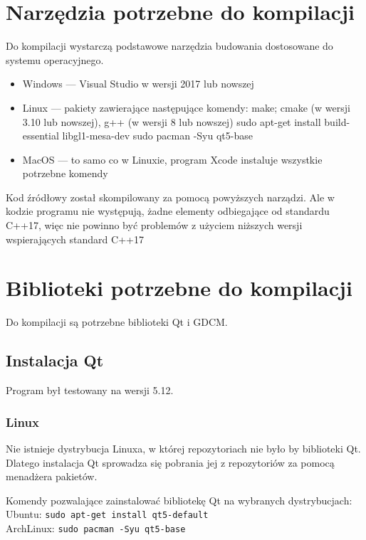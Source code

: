 
\section{Narzędzia potrzebne do kompilacji}

\par
Do kompilacji wystarczą podstawowe narzędzia budowania dostosowane do systemu operacyjnego.

\begin{itemize}
    \item Windows --- Visual Studio w wersji 2017 lub nowszej
    \item Linux --- pakiety zawierające następujące komendy: make; cmake (w wersji 3.10 lub nowszej), g++ (w wersji 8 lub nowszej)
    sudo apt-get install build-essential libgl1-mesa-dev
sudo pacman -Syu qt5-base
    \item MacOS --- to samo co w Linuxie, program Xcode instaluje wszystkie potrzebne komendy
\end{itemize}

Kod źródłowy został skompilowany za pomocą powyższych narządzi.
Ale w kodzie programu nie występują, żadne elementy odbiegające od standardu C++17, więc nie powinno być problemów z użyciem niższych wersji wspierających standard C++17

\section{Biblioteki potrzebne do kompilacji}

Do kompilacji są potrzebne biblioteki Qt i GDCM.


\subsection{Instalacja Qt}

Program był testowany na wersji 5.12.

\subsubsection*{Linux}

Nie istnieje dystrybucja Linuxa, w której repozytoriach nie było by biblioteki Qt.
Dlatego instalacja Qt sprowadza się pobrania jej z repozytoriów za pomocą menadżera pakietów.
\par
Komendy pozwalające zainstalować bibliotekę Qt na wybranych dystrybucjach:\\
Ubuntu: \texttt{sudo apt-get install qt5-default}\\
ArchLinux: \texttt{sudo pacman -Syu qt5-base}

